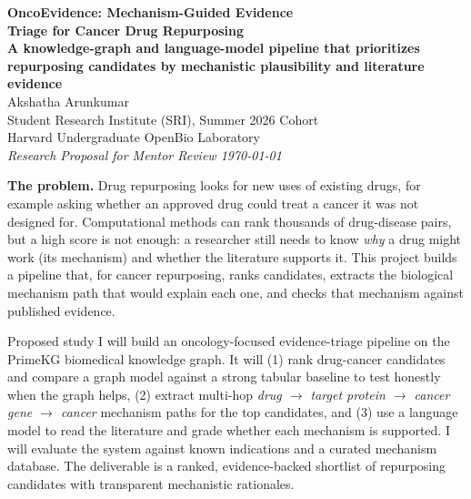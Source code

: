 \documentclass[11pt]{article}
\begin{document}
\begin{center}
  {\LARGE\bfseries\color{sriblue} OncoEvidence: Mechanism-Guided Evidence\\ Triage for Cancer Drug Repurposing}\\[4pt]
  {\large\bfseries\color{sriblue!80!black} A knowledge-graph and language-model pipeline that prioritizes\\ repurposing candidates by mechanistic plausibility and literature evidence}\\[10pt]
  {\large Akshatha Arunkumar}\\[2pt]
  {\small Student Research Institute (SRI), Summer 2026 Cohort \\
  Harvard Undergraduate OpenBio Laboratory}\\[2pt]
  {\small\itshape Research Proposal for Mentor Review \quad\textbar\quad \today}
\end{center}

\vspace{2pt}
\begin{problembox}
\textbf{The problem.} Drug repurposing looks for new uses of existing drugs, for
example asking whether an approved drug could treat a cancer it was not designed
for. Computational methods can rank thousands of drug-disease pairs, but a high
score is not enough: a researcher still needs to know \emph{why} a drug might work
(its mechanism) and whether the literature supports it. This project builds a
pipeline that, for cancer repurposing, ranks candidates, extracts the biological
mechanism path that would explain each one, and checks that mechanism against
published evidence.
\end{problembox}

\begin{aimbox}{Proposed study}
I will build an oncology-focused evidence-triage pipeline on the PrimeKG
biomedical knowledge graph. It will (1) rank drug-cancer candidates and compare a
graph model against a strong tabular baseline to test honestly when the graph
helps, (2) extract multi-hop \emph{drug $\rightarrow$ target protein $\rightarrow$
cancer gene $\rightarrow$ cancer} mechanism paths for the top candidates, and
(3) use a language model to read the literature and grade whether each mechanism
is supported. I will evaluate the system against known indications and a curated
mechanism database. The deliverable is a ranked, evidence-backed shortlist of
repurposing candidates with transparent mechanistic rationales.
\end{aimbox}
\end{document}
